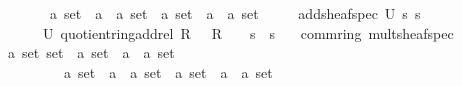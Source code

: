 \documentclass[12pt]{scrartcl}
\begin{document}
\begin{isabelle}
\ \ \ \ \ \ \ \ \ \ {\isasymRightarrow}\ {\isacharparenleft}{\kern0pt}{\isacharprime}{\kern0pt}a\ set\ {\isasymRightarrow}\ {\isacharparenleft}{\kern0pt}{\isacharprime}{\kern0pt}a\ {\isasymtimes}\ {\isacharprime}{\kern0pt}a{\isacharparenright}{\kern0pt}\ set{\isacharparenright}{\kern0pt}\ {\isasymRightarrow}\ {\isacharparenleft}{\kern0pt}{\isacharprime}{\kern0pt}a\ set\ {\isasymRightarrow}\ {\isacharparenleft}{\kern0pt}{\isacharprime}{\kern0pt}a\ {\isasymtimes}\ {\isacharprime}{\kern0pt}a{\isacharparenright}{\kern0pt}\ set{\isacharparenright}{\kern0pt}{\isachardoublequoteclose}\isanewline
\ \ \ \ \ {\isachardoublequoteopen}add{\isacharunderscore}{\kern0pt}sheaf{\isacharunderscore}{\kern0pt}spec\ U\ s\ s{\isacharprime}{\kern0pt}\ {\isasymequiv}\ \isanewline
\ \ \ \ \ \ \ \ \ \ {\isasymlambda}{\isasympp}{\isasymin}U{\isachardot}{\kern0pt}\ quotient{\isacharunderscore}{\kern0pt}ring{\isachardot}{\kern0pt}add{\isacharunderscore}{\kern0pt}rel\ {\isacharparenleft}{\kern0pt}R\ {\isasymsetminus}\ {\isasympp}{\isacharparenright}{\kern0pt}\ R\ {\isacharparenleft}{\kern0pt}{\isacharplus}{\kern0pt}{\isacharparenright}{\kern0pt}\ {\isacharparenleft}{\kern0pt}{\isasymcdot}{\isacharparenright}{\kern0pt}\ {\isasymzero}\ {\isacharparenleft}{\kern0pt}s\ {\isasympp}{\isacharparenright}{\kern0pt}\ {\isacharparenleft}{\kern0pt}s{\isacharprime}{\kern0pt}\ {\isasympp}{\isacharparenright}{\kern0pt}{\isachardoublequoteclose}\isanewline
\isanewline
{}\isamarkupfalse%
\ {\isacharparenleft}{\kern0pt}\ comm{\isacharunderscore}{\kern0pt}ring{\isacharparenright}{\kern0pt}\ mult{\isacharunderscore}{\kern0pt}sheaf{\isacharunderscore}{\kern0pt}spec\isanewline
\ \ \ \ {\isacharcolon}{\kern0pt}{\isacharcolon}{\kern0pt}\ {\isachardoublequoteopen}{\isacharparenleft}{\kern0pt}{\isacharprime}{\kern0pt}a\ set{\isacharparenright}{\kern0pt}\ set\ {\isasymRightarrow}\ {\isacharparenleft}{\kern0pt}{\isacharprime}{\kern0pt}a\ set\ {\isasymRightarrow}\ {\isacharparenleft}{\kern0pt}{\isacharprime}{\kern0pt}a\ {\isasymtimes}\ {\isacharprime}{\kern0pt}a{\isacharparenright}{\kern0pt}\ set{\isacharparenright}{\kern0pt}\ \isanewline
\ \ \ \ \ \ \ \ \ \ \ \ {\isasymRightarrow}\ {\isacharparenleft}{\kern0pt}{\isacharprime}{\kern0pt}a\ set\ {\isasymRightarrow}\ {\isacharparenleft}{\kern0pt}{\isacharprime}{\kern0pt}a\ {\isasymtimes}\ {\isacharprime}{\kern0pt}a{\isacharparenright}{\kern0pt}\ set{\isacharparenright}{\kern0pt}\ {\isasymRightarrow}\ {\isacharparenleft}{\kern0pt}{\isacharprime}{\kern0pt}a\ set\ {\isasymRightarrow}\ {\isacharparenleft}{\kern0pt}{\isacharprime}{\kern0pt}a\ {\isasymtimes}\ {\isacharprime}{\kern0pt}a{\isacharparenright}{\kern0pt}\ set{\isacharparenright}{\kern0pt}{\isachardoublequoteclose}\isanewline

\end{isabelle}
\end{document}
